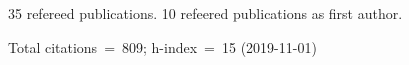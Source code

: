 35 refereed publications. 10 refeered publications as first author.

Total citations~=~809; h-index~=~15 (2019-11-01)